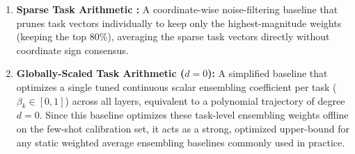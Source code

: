 \begin{enumerate}
    \item \textbf{Sparse Task Arithmetic \cite{drago2024sparse}:} A coordinate-wise noise-filtering baseline that prunes task vectors individually to keep only the highest-magnitude weights (keeping the top 80\%), averaging the sparse task vectors directly without coordinate sign consensus.
    \item \textbf{Globally-Scaled Task Arithmetic ($d=0$):} A simplified baseline that optimizes a single tuned continuous scalar ensembling coefficient per task ($\beta_k \in [0, 1]$) across all layers, equivalent to a polynomial trajectory of degree $d = 0$. Since this baseline optimizes these task-level ensembling weights offline on the few-shot calibration set, it acts as a strong, optimized upper-bound for any static weighted average ensembling baselines commonly used in practice.
\end{enumerate}

